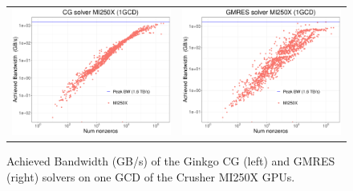 \begin{figure}[!h]
  \centering
  \begin{tabular}{lr}
    \includegraphics[width=.34\columnwidth]{projects/2.3.3-MathLibs/2.3.3.13-CLOVER/ginkgo_eas/bw_cg_solver.pdf}
    &
    \includegraphics[width=.34\columnwidth]{projects/2.3.3-MathLibs/2.3.3.13-CLOVER/ginkgo_eas/bw_gmres_solver.pdf}
  \end{tabular}
  \caption{Achieved Bandwidth (GB/s) of the Ginkgo CG (left) and GMRES (right) solvers on one
    GCD of the Crusher MI250X GPUs.}
  \label{fig:gko-crusher-solvers}
\end{figure}

